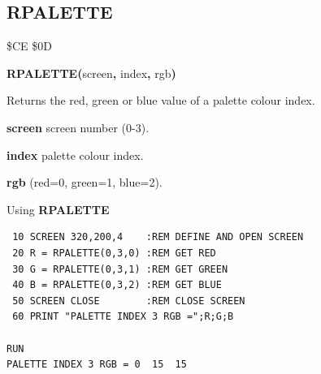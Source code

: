 \subsection{RPALETTE}
\begin{description}[leftmargin=2cm,style=nextline]
\item [Token:] \$CE \$0D
\item [Format:] {\bf RPALETTE(}screen{\bf,} index{\bf,} rgb{\bf)}
\item [Usage:]  Returns the red, green or blue value of
                a palette colour index.

                {\bf screen} screen number (0-3).

                {\bf index} palette colour index.

                {\bf rgb} (red=0, green=1, blue=2).

\item [Example:] Using {\bf RPALETTE}

\begin{tcolorbox}[colback=black,coltext=white]
\verbatimfont{\codefont}
\begin{verbatim}
 10 SCREEN 320,200,4    :REM DEFINE AND OPEN SCREEN
 20 R = RPALETTE(0,3,0) :REM GET RED
 30 G = RPALETTE(0,3,1) :REM GET GREEN
 40 B = RPALETTE(0,3,2) :REM GET BLUE
 50 SCREEN CLOSE        :REM CLOSE SCREEN
 60 PRINT "PALETTE INDEX 3 RGB =";R;G;B

RUN
PALETTE INDEX 3 RGB = 0  15  15
\end{verbatim}
\end{tcolorbox}
\end{description}


\newpage
